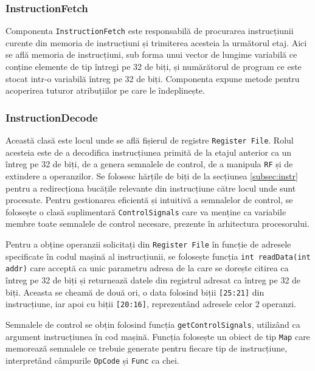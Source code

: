 \documentclass{article}
\begin{document}
\subsubsection{InstructionFetch}
Componenta \texttt{InstructionFetch} este responsabilă de procurarea instrucțiunii curente din memoria de instrucțiuni și trimiterea acesteia la următorul etaj. Aici se află memoria de instrucțiuni, sub forma unui vector de lungime variabilă ce conține elemente de tip întregi pe 32 de biți, și numărătorul de program ce este stocat intr-o variabilă întreg pe 32 de biți. Componenta expune metode pentru acoperirea tuturor atribuțiilor pe care le îndeplinește.

\subsubsection{InstructionDecode}
Această clasă este locul unde se află fișierul de registre \texttt{Register File}. Rolul acesteia este de a decodifica instrucțiunea primită de la etajul anterior ca un întreg pe 32 de biți, de a genera semnalele de control, de a manipula \texttt{RF} și de extindere a operanzilor. Se folosesc hărțile de biți de la secțiunea \ref{subsec:instr} pentru a redirecționa bucățile relevante din instrucțiune către locul unde sunt procesate. Pentru gestionarea eficientă și intuitivă a semnalelor de control, se folosește o clasă suplimentară \texttt{ControlSignals} care va menține ca variabile membre toate semnalele de control necesare, prezente în arhitectura procesorului. 

Pentru a obține operanzii solicitați din \texttt{Register File} în funcție de adresele specificate în codul mașină al instrucțiunii, se folosește funcția \texttt{int readData(int addr)} care acceptă ca unic parametru adresa de la care se dorește citirea ca întreg pe 32 de biți și returnează datele din registrul adresat ca întreg pe 32 de biți. Aceasta se cheamă de două ori, o data folosind biții \texttt{[25:21]} din instrucțiune, iar apoi cu biții \texttt{[20:16]}, reprezentând adresele celor 2 operanzi. 

Semnalele de control se obțin folosind funcția \texttt{getControlSignals}, utilizând ca argument instrucțiunea în cod mașină. Funcția folosește un obiect de tip \texttt{Map} care memorează semnalele ce trebuie generate pentru fiecare tip de instrucțiune, interpretând câmpurile \texttt{OpCode} și \texttt{Func} ca chei.
\end{document}
